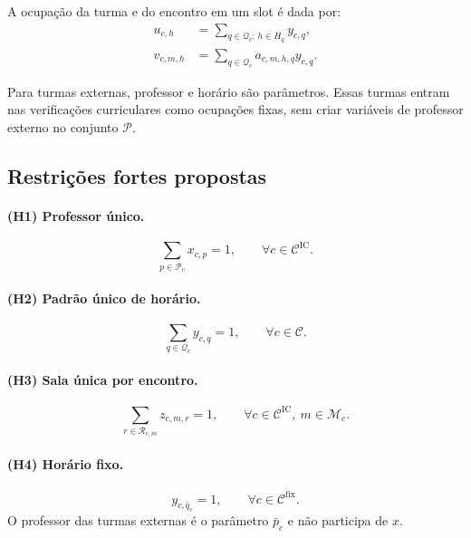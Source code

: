 A ocupação da turma e do encontro em um slot é dada por:
\begin{align}
    u_{c,h} &= \sum_{q\in\mathcal{Q}_c:\,h\in H_q} y_{c,q},\\
    v_{c,m,h} &= \sum_{q\in\mathcal{Q}_c} a_{c,m,h,q}y_{c,q}.
\end{align}

Para turmas externas, professor e horário são parâmetros. Essas turmas entram nas verificações curriculares como ocupações fixas, sem criar variáveis de professor externo no conjunto $\mathcal{P}$.

\subsection{Restrições fortes propostas}
\label{subsec:restricoes_hard}

\paragraph{(H1) Professor único.}
\begin{equation}
    \sum_{p\in\mathcal{P}_c}x_{c,p}=1,
    \qquad \forall c\in\mathcal{C}^{\mathrm{IC}}.
\end{equation}

\paragraph{(H2) Padrão único de horário.}
\begin{equation}
    \sum_{q\in\mathcal{Q}_c}y_{c,q}=1,
    \qquad \forall c\in\mathcal{C}.
\end{equation}

\paragraph{(H3) Sala única por encontro.}
\begin{equation}
    \sum_{r\in\mathcal{R}_{c,m}}z_{c,m,r}=1,
    \qquad \forall c\in\mathcal{C}^{\mathrm{IC}},\ m\in\mathcal{M}_c.
\end{equation}

\paragraph{(H4) Horário fixo.}
\begin{equation}
    y_{c,\bar q_c}=1,
    \qquad \forall c\in\mathcal{C}^{\mathrm{fix}}.
\end{equation}
O professor das turmas externas é o parâmetro $\bar p_c$ e não participa de $x$.

